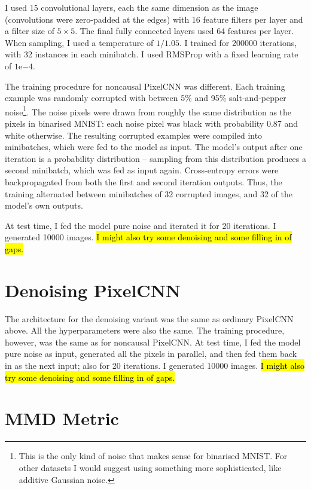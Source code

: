 \documentclass[11pt, a4paper, openany]{book}
\begin{document}
I used 15 convolutional layers, each the same dimension as the image (convolutions were zero-padded at the edges) with 16 feature filters per layer and a filter size of $5\times 5$. The final fully connected layers used 64 features per layer. When sampling, I used a temperature of $1/1.05$. I trained for 200000 iterations, with 32 instances in each minibatch. I used RMSProp with a fixed learning rate of $1\mathrm{e}{-4}$.

The training procedure for noncausal PixelCNN was different. Each training example was randomly corrupted with between 5\% and 95\% salt-and-pepper noise\footnote{This is the only kind of noise that makes sense for binarised MNIST. For other datasets I would suggest using something more sophisticated, like additive Gaussian noise.}. The noise pixels were drawn from roughly the same distribution as the pixels in binarised MNIST: each noise pixel was black with probability 0.87 and white otherwise. The resulting corrupted examples were compiled into minibatches, which were fed to the model as input. The model's output after one iteration is a probability distribution -- sampling from this distribution produces a second minibatch, which was fed as input again. Cross-entropy errors were backpropagated from both the first and second iteration outputs. Thus, the training alternated between minibatches of 32 corrupted images, and 32 of the model's own outputs.

At test time, I fed the model pure noise and iterated it for 20 iterations. I generated 10000 images. \hl{I might also try some denoising and some filling in of gaps.}

\section{Denoising PixelCNN}

The architecture for the denoising variant was the same as ordinary PixelCNN above. All the hyperparameters were also the same. The training procedure, however, was the same as for noncausal PixelCNN. At test time, I fed the model pure noise as input, generated all the pixels in parallel, and then fed them back in as the next input; also for 20 iterations. I generated 10000 images. \hl{I might also try some denoising and some filling in of gaps.}

\section{MMD Metric}
\end{document}
